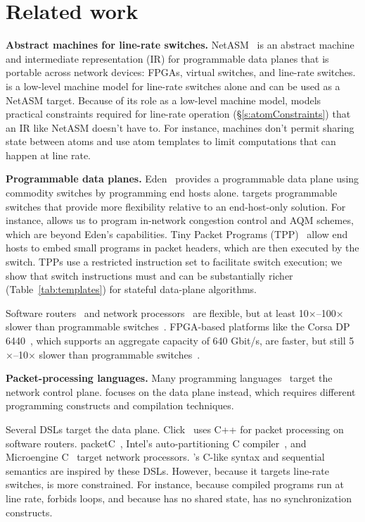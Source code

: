 \section{Related work}
\label{s:related}
\textbf{Abstract machines for line-rate switches.}
NetASM~\cite{netasm} is an abstract machine and intermediate representation
(IR) for programmable data planes that is portable across network
devices: FPGAs, virtual switches, and line-rate switches.  \absmachine is a
low-level machine model for line-rate switches alone and can be used as a
NetASM target. Because of its role as a low-level machine model, \absmachine
models practical constraints required for line-rate operation (\S\ref{s:atomConstraints}) that an IR like
NetASM doesn't have to. For instance, \absmachine machines don't permit sharing
state between atoms and use atom templates to limit computations that can
happen at line rate.

\textbf{Programmable data planes.}
Eden~\cite{eden} provides a programmable data plane using commodity switches by
programming end hosts alone. \pktlanguage targets programmable switches that
provide more flexibility relative to an end-host-only solution. For instance,
\pktlanguage allows us to program in-network congestion control and AQM
schemes, which are beyond Eden's capabilities.  Tiny Packet Programs
(TPP)~\cite{tpp} allow end hosts to embed small programs in packet headers,
which are then executed by the switch. TPPs use a restricted instruction set to
facilitate switch execution; we show that switch instructions must and can be
substantially richer (Table~\ref{tab:templates}) for stateful data-plane
algorithms.

Software routers~\cite{click, routebricks} and network processors~\cite{ixp4xx}
are flexible, but at least 10$\times$--100$\times$ slower than programmable
switches~\cite{xpliant, tofino}.  FPGA-based platforms like the Corsa DP
6440~\cite{corsa}, which supports an aggregate capacity of 640 Gbit/s, are
faster, but still 5$\times$--10$\times$ slower than programmable
switches~\cite{xpliant, tofino}.

\textbf{Packet-processing languages.} Many programming languages~\cite{frenetic, maple} target the network control plane.
\pktlanguage focuses on the data plane instead, which requires different
programming constructs and compilation techniques.

Several DSLs target the data plane. Click~\cite{click} uses C++ for packet
processing on software routers. packetC~\cite{packetc}, Intel's
auto-partitioning C compiler~\cite{intel_uiuc_pldi}, and Microengine
C~\cite{microenginec} target network processors. \pktlanguage's C-like syntax
and sequential semantics are inspired by these DSLs. However, because it targets
line-rate switches, \pktlanguage is more constrained. For instance, because
compiled programs run at line rate, \pktlanguage forbids loops, and because
\absmachine has no shared state, \pktlanguage has no synchronization constructs.


